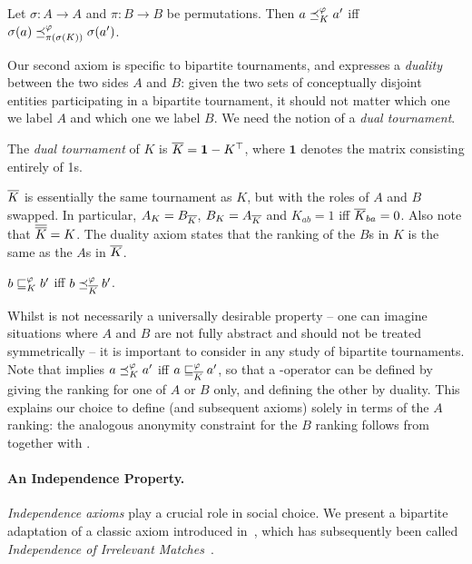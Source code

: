 \begin{axiom}[anon]
    Let $\sigma:A \to A$ and $\pi:B \to B$ be permutations. Then $a \preceq_K^\varphi
    a'$ iff $\sigma(a) \preceq_{\pi(\sigma(K))}^\varphi \sigma(a')$.
\end{axiom}

Our second axiom is specific to bipartite tournaments, and expresses a
\emph{duality} between the two sides $A$ and $B$: given the two sets of
conceptually disjoint entities participating in a bipartite tournament, it
should not matter which one we label $A$ and which one we label $B$. We need
the notion of a \emph{dual tournament}.

\begin{definition}%

    The \emph{dual tournament} of $K$ is ${\overline{K}} = \bm{1} - K^\top$, where
    $\bm{1}$ denotes the matrix consisting entirely of 1s.

\end{definition}

${\overline{K}}$ is essentially the same tournament as $K$, but with the roles of $A$
and $B$ swapped. In particular, $A_K = B_{\overline{K}}$, $B_K = A_{\overline{K}}$ and
$K_{ab} = 1$ iff ${\overline{K}}_{ba} = 0$. Also note that ${\overline{{\overline{K}}}} = K$.
The duality axiom states that the ranking of the $B$s in $K$ is the same as the
$A$s in ${\overline{K}}$.

\begin{axiom}[dual]
    $b \sqsubseteq_K^\varphi b'$ iff $b \preceq_{\overline{K}}^\varphi b'$.
\end{axiom}

Whilst  is not necessarily a universally desirable property --
one can imagine situations where $A$ and $B$ are not fully abstract and should
not be treated symmetrically -- it is important to consider in any study of
bipartite tournaments. Note that  implies $a \preceq_K^\varphi
a'$ iff $a \sqsubseteq_{{\overline{K}}}^\varphi a'$, so that a -operator can be
defined by giving the ranking for one of $A$ or $B$ only, and defining the
other by duality. This explains our choice to define  (and
subsequent axioms) solely in terms of the $A$ ranking: the analogous anonymity
constraint for the $B$ ranking follows from  together with
.

\paragraph{An Independence Property.}
%
\emph{Independence axioms} play a crucial role in social choice. We present a
bipartite adaptation of a classic axiom introduced
in~\cite{rubinstein1980ranking}, which has subsequently been called
\emph{Independence of Irrelevant Matches}~\cite{gonzalez2014paired}.

